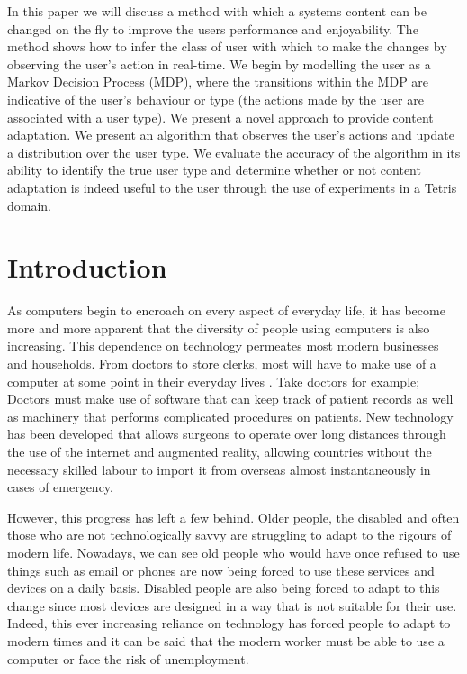 \documentclass[11pt]{article}
\begin{document}
\begin{titlepage}
\vspace{6.0 mm}

In this paper we will discuss a method with which a systems content can be changed on the fly to improve the users performance and enjoyability. The method shows how to infer the class of user with which to make the changes by observing the user's action in real-time. We begin by modelling the user as a Markov Decision Process (MDP), where the transitions within the MDP are indicative of the user's behaviour or type (the actions made by the user are associated with a user type). We present a novel approach to provide content adaptation. 
We present an algorithm that observes the user's actions and update a distribution over the user type. We evaluate the accuracy of the algorithm in its ability to identify the true user type and determine whether or not content adaptation is indeed useful to the user through the use of experiments in a Tetris domain.

\clearpage

\tableofcontents

\end{titlepage}
\clearpage
{} 
\section{Introduction}
As computers begin to encroach on every aspect of everyday life, it has become more and more apparent that the diversity of people using computers is also increasing. This dependence on technology permeates most modern businesses and households. From doctors to store clerks, most will have to make use of a computer at some point in their everyday lives \citep{beaudry2005understanding}. Take doctors for example; Doctors must make use of software that can keep track of patient records as well as machinery that performs complicated procedures on patients. New technology has been developed that allows surgeons to operate over long distances through the use of the internet and augmented reality, allowing countries without the necessary skilled labour to import it from overseas almost instantaneously in cases of emergency.
\vspace{4.0 mm}

However, this progress has left a few behind. Older people, the disabled and often those who are not technologically savvy are struggling to adapt to the rigours of modern life. Nowadays, we can see old people who would have once refused to use things such as email or phones are now being forced to use these services and devices on a daily basis. Disabled people  are also being forced to adapt to this change since most devices are designed in a way that is not suitable for their use\citep{gajos2008improving}. Indeed, this ever increasing reliance on technology has forced people to adapt to modern times and it can be said that the modern worker must be able to use a computer or face the risk of unemployment.
\vspace{4.0 mm}
\end{document}
